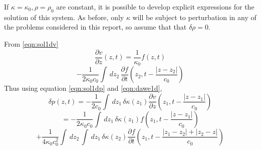 If $\kappa=\kappa_0, \rho=\rho_0 $ are constant, it is possible to develop explicit
expressions for the solution of this system. As before, only $\kappa$ will be
subject to perturbation in any of the problems considered in this
report, so assume that that $\delta\rho=0$.

From \ref{eqn:sol1dv}
\[
  \frac{\partial v}{\partial z}(z,t) = \frac{1}{\kappa_0} f(z,t) 
\]
\begin{equation}
  \label{eqn:sol1ddvdz}
 - \frac{1}{2\kappa_0c_0} \int\, dz_2\, \frac{\partial f}{\partial t}\left(z_2,t - \frac{|z-z_2|}{c_0}\right)
\end{equation}
Thus using equation \ref{eqn:sol1dp} and \ref{eqn:dawe1d}, 
\[
  \delta p(z,t) =- \frac{1}{2c_0} \int \, dz_1 \, \delta
  \kappa(z_1)\frac{\partial v}{\partial z}\left(z_1,t - \frac{|z-z_1|}{c_0}\right)
\]
\[
  =-\frac{1}{2\kappa_0c_0} \int \,dz_1\, \delta
  \kappa(z_1) f \left(z_1,t - \frac{|z-z_1|}{c_0}\right)
  \]
\begin{equation}
  \label{eqn:sol1ddp}
  + \frac{1}{4\kappa_0c_0^2} \int\,dz_2 \, \int \,dz_1\,\delta 
  \kappa(z_2) \frac{\partial f}{\partial t}\left(z_1,t - \frac{|z_1-z_2|+|z_2-z|}{c_0}\right)
\end{equation}

